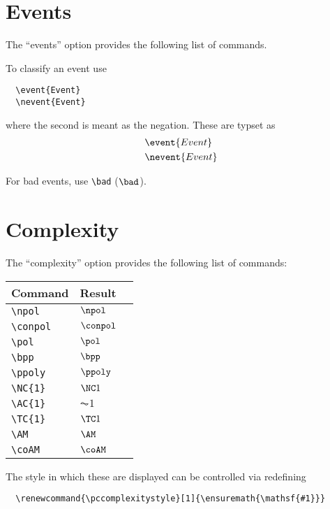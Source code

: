 \documentclass[a4paper]{report}
\begin{document}
  \section{Events}
  The \enquote{events} option provides the following list of commands. 
  
  To classify an event use
  \begin{lstlisting}
  \event{Event}
  \nevent{Event}
  \end{lstlisting}
  where the second is meant as the negation. These are typset as
  \begin{align*}
  &\event{Event}\\
  &\nevent{Event}
  \end{align*}
  
  For bad events, use \lstinline$\bad$ ($\bad$).
  
  \section{Complexity}
  The \enquote{complexity} option provides the following list of commands:
  
  \begin{center}
  \begin{tabular}{l l l}
  \textbf{Command} & \textbf{Result} \\\hline
  \lstinline$\npol$ &  $\npol$  \\
  \lstinline$\conpol$ &  $\conpol$  \\
  \lstinline$\pol$ &  $\pol$  \\
  \lstinline$\bpp$ & $\bpp$  \\
  \lstinline$\ppoly$ & $\ppoly$  \\
  \lstinline$\NC{1}$ &  $\NC1$  \\
  \lstinline$\AC{1}$ & $\AC1$  \\
  \lstinline$\TC{1}$ & $\TC1$ \\
  \lstinline$\AM$ &  $\AM$  \\
  \lstinline$\coAM$ &  $\coAM$  
  \end{tabular}
  \end{center}
  
  The style in which these are displayed can be controlled via redefining
  \begin{lstlisting}
  \renewcommand{\pccomplexitystyle}[1]{\ensuremath{\mathsf{#1}}}
  \end{lstlisting}
  
\end{document}
